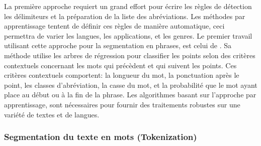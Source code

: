 \documentclass[a4paper,12pt,oneside]{../use/ESIthesis}
\begin{document}
La première approche requiert un grand effort pour écrire les règles de détection les délimiteurs et la préparation de la liste des abréviations. 
Les méthodes par apprentissage tentent de définir ces règles de manière automatique, ceci permettra de varier les langues, les applications, et les genres. 
Le premier travail utilisant cette approche pour la segmentation en phrases, est celui de \cite{89-riley}. 
Sa méthode utilise les arbres de régression \cite{84-breiman-al} pour classifier les points selon des critères contextuels concernant les mots qui précèdent et qui suivent les points. 
Ces critères contextuels comportent: la longueur du mot, la ponctuation après le point, les classes d'abréviation, la casse du mot, et la probabilité que le mot ayant place au début ou à la fin de la phrase. 
Les algorithmes basant sur l'approche par apprentissage, sont nécessaires pour fournir des traitements robustes sur une variété de textes et de langues. 

\subsubsection{Segmentation du texte en mots (Tokenization)}
\end{document}
